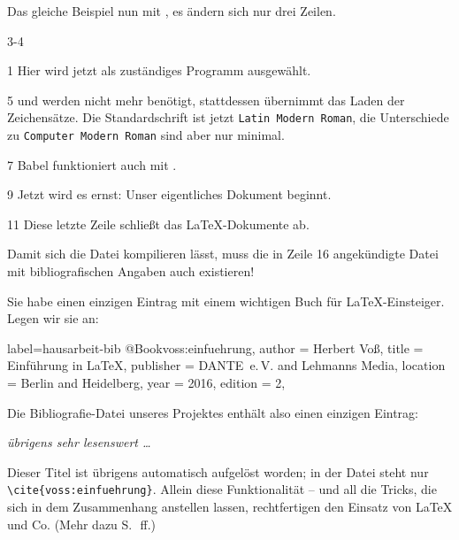 Das gleiche Beispiel nun mit \LuaLaTeX{}, es ändern sich nur drei Zeilen.
 

\begin{labeling}{3-4}

 \item[1] Hier wird jetzt \LuaLaTeX{} als zuständiges Programm ausgewählt. 
  
 \item[5]  und  werden nicht mehr benötigt,
   stattdessen übernimmt  das Laden der Zeichensätze.  Die
   Standardschrift ist jetzt \texttt{Latin Modern Roman}, die Unterschiede
   zu \texttt{Computer Modern Roman} sind aber nur minimal. 

 \item[7] Babel funktioniert auch mit \LuaLaTeX{}.
 
 \item[9] Jetzt wird es ernst: Unser eigentliches Dokument beginnt.
 
 \item[11] Diese letzte Zeile schließt das \LaTeX -Dokumente ab.

 \end{labeling}

 

Damit sich die Datei kompilieren lässt, muss die in Zeile 16 angekündigte Datei mit 
bibliografischen Angaben auch existieren!

Sie habe einen einzigen Eintrag mit einem wichtigen Buch für \LaTeX -Einsteiger.
Legen wir sie an:

\begin{lfgwcode}{label={hausarbeit-bib}}
@Book{voss:einfuehrung,
 author    = {Herbert Voß}, 
 title     = {Einführung in \LaTeX},
 publisher = {DANTE~e.\,V. and Lehmanns Media},
 location  = {Berlin and Heidelberg},
 year      = {2016},
 edition   = {2},
}
\end{lfgwcode}

Die Bibliografie-Datei unseres Projektes enthält also einen einzigen Eintrag:
\bigskip

\parbox{40mm}{
   \emph{übrigens sehr lesenswert \dots}
}
\bigskip

Dieser Titel ist übrigens automatisch aufgelöst worden; 
in der Datei steht nur \lstinline/\cite{voss:einfuehrung}/.
Allein diese Funktionalität -- und all die Tricks, die sich in dem Zusammenhang anstellen
lassen, rechtfertigen den Einsatz von \LaTeX{} und Co. (Mehr dazu S.~\pageref{biblatex}\,ff.)

\endinput


